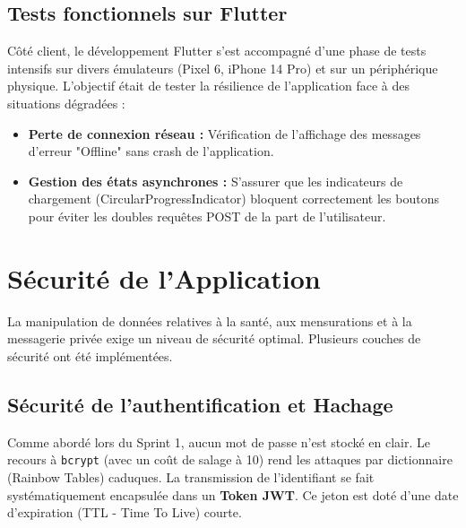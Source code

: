 \subsection{Tests fonctionnels sur Flutter}
Côté client, le développement Flutter s'est accompagné d'une phase de tests intensifs sur divers émulateurs (Pixel 6, iPhone 14 Pro) et sur un périphérique physique.
L'objectif était de tester la résilience de l'application face à des situations dégradées :
\begin{itemize}
    \item \textbf{Perte de connexion réseau :} Vérification de l'affichage des messages d'erreur "Offline" sans crash de l'application.
    \item \textbf{Gestion des états asynchrones :} S'assurer que les indicateurs de chargement (CircularProgressIndicator) bloquent correctement les boutons pour éviter les doubles requêtes POST de la part de l'utilisateur.
\end{itemize}

\section{Sécurité de l'Application}
La manipulation de données relatives à la santé, aux mensurations et à la messagerie privée exige un niveau de sécurité optimal. Plusieurs couches de sécurité ont été implémentées.

\subsection{Sécurité de l'authentification et Hachage}
Comme abordé lors du Sprint 1, aucun mot de passe n'est stocké en clair. Le recours à \texttt{bcrypt} (avec un coût de salage à 10) rend les attaques par dictionnaire (Rainbow Tables) caduques.
La transmission de l'identifiant se fait systématiquement encapsulée dans un \textbf{Token JWT}. Ce jeton est doté d'une date d'expiration (TTL - Time To Live) courte. 

